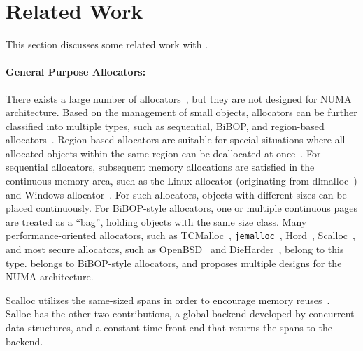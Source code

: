 \section{Related Work}

\label{sec:related}

This section discusses some related work with \NM{}. 

\paragraph{General Purpose Allocators:}
 There exists a large number of allocators~\cite{dlmalloc, Hoard, TCMalloc, jemalloc, Scalloc}, but they are not designed for NUMA architecture. Based on the management of small objects, allocators can be further classified into multiple types, such as sequential, BiBOP, and region-based allocators~\cite{DieHarder, Gay:1998:MME:277650.277748}. Region-based allocators are suitable for special situations where all allocated objects within the same region can be deallocated at once~\cite{Gay:1998:MME:277650.277748}. For sequential allocators, subsequent memory allocations are satisfied in the continuous memory area, such as the Linux allocator (originating from dlmalloc~\cite{dlmalloc}) and Windows allocator~\cite{DieHarder}. For such allocators, objects with different sizes can be placed continuously. For BiBOP-style allocators, one or multiple continuous pages are treated as a ``bag'', holding objects with the same size class. %
 Many performance-oriented allocators, such as TCMalloc~\cite{TCMalloc}, \texttt{jemalloc}~\cite{jemalloc}, Hord~\cite{Hoard}, Scalloc~\cite{Scalloc}, and most secure allocators, such as OpenBSD~\cite{OpenBSD} and DieHarder~\cite{DieHarder}, belong to this type.  \NM{} belongs to BiBOP-style allocators, and proposes multiple designs for the NUMA architecture. 


Scalloc utilizes the same-sized spans in order to encourage memory reuses~\cite{Scalloc}. Salloc has the other two contributions, a global backend developed by concurrent data structures, and a constant-time front end that returns the spans to the backend. 
% 


